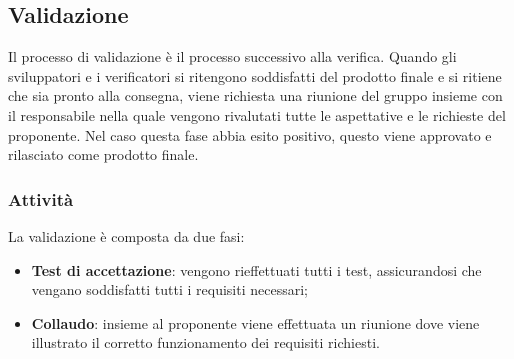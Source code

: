 \subsection{Validazione}
Il processo di validazione è il processo successivo alla verifica. Quando gli sviluppatori e i verificatori si ritengono soddisfatti del prodotto finale e si ritiene che sia pronto alla consegna, viene richiesta una riunione del gruppo insieme con il responsabile nella quale vengono rivalutati tutte le aspettative e le richieste del proponente. Nel caso questa fase abbia esito positivo, questo viene approvato e rilasciato come prodotto finale.
\subsubsection{Attività}
La validazione è composta da due fasi:
\begin{itemize}
\item \textbf{Test di accettazione}: vengono rieffettuati tutti i test, assicurandosi che vengano soddisfatti tutti i requisiti necessari;
\item \textbf{Collaudo}: insieme al proponente viene effettuata un riunione dove viene illustrato il corretto funzionamento dei requisiti richiesti. 
\end{itemize}